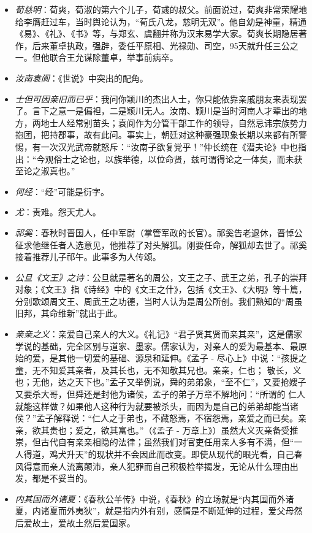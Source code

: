 \documentclass[]{book}
\providecommand{\tightlist}{%
  \setlength{\itemsep}{0pt}\setlength{\parskip}{0pt}}
\begin{document}
\begin{itemize}
\tightlist
\item
  \emph{荀慈明}：荀爽，荀淑的第六个儿子，荀彧的叔父。前面说过，荀爽非常荣耀地给李膺赶过车，当时舆论认为，``荀氏八龙，慈明无双''。他自幼是神童，精通《易》、《礼》、《书》等，与郑玄、虞翻并称为汉末易学大家。荀爽长期隐居著作，后来董卓执政，强辟，委任平原相、光禄勋、司空，95天就升任三公之一。但他联合王允谋除董卓，举事前病卒。
\item
  \emph{汝南袁阆}：《世说》中突出的配角。
\item
  \emph{士但可因亲旧而已乎}：我问你颖川的杰出人士，你只能依靠亲戚朋友来表现罢了。言下之意一是偏袒，二是颖川无人。汝南、颖川是当时河南人才辈出的地方，两地士人经常别苗头；袁阆作为分管干部工作的领导，自然忌讳宗族势力抱团，把持郡事，故有此问。事实上，朝廷对这种豪强现象长期以来都有所警惕，有一次汉光武帝就怒斥：``汝南子欲复党乎！''仲长统在《潜夫论》中也指出：``今观俗士之论也，以族举德，以位命贤，兹可谓得论之一体矣，而未获至论之淑真也。''
\item
  \emph{何经}：``经''可能是衍字。
\item
  \emph{尤}：责难。怨天尤人。
\item
  \emph{祁奚}：春秋时晋国人，任中军尉（掌管军政的长官）。祁奚告老退休，晋悼公征求他继任者人选意见，他推荐了对头解狐。刚要任命，解狐却去世了。祁奚接着推荐儿子祁午。此事多为人传颂。
\item
  \emph{公旦《文王》之诗}：公旦就是著名的周公，文王之子、武王之弟，孔子的崇拜对象；《文王》指《诗经》中的《文王之什》，包括《文王》、《大明》等十篇，分别歌颂周文王、周武王之功德，当时人认为是周公所创。我们熟知的``周虽旧邦，其命维新''就出于此。
\item
  \emph{亲亲之义}：亲爱自己亲人的大义。《礼记》``君子贤其贤而亲其亲''，这是儒家学说的基础，完全区别与道家、墨家。儒家认为，对亲人的爱为最基本、最原始的爱，是其他一切爱的基础、源泉和延伸。《孟子
  -
  尽心上》中说：``孩提之童，无不知爱其亲者，及其长也，无不知敬其兄也。亲亲，仁也；
  敬长，义也；无他，达之天下也。''孟子又举例说，舜的弟弟象，``至不仁''，又要抢嫂子又要杀大哥，但舜还是封他为诸侯，孟子的弟子万章不解地问：``所谓的
  仁人就能这样做？如果他人这种行为就要被杀头，而因为是自己的弟弟却能当诸侯？''孟子解释说：``仁人之于弟也，不藏怒焉，不宿怨焉，亲爱之而已矣。亲亲，欲其贵也；爱之，欲其富也。''（《孟子
  -
  万章上》）虽然大义灭亲备受推崇，但古代自有亲亲相隐的法律；虽然我们对官吏任用亲人多有不满，但``一人得道，鸡犬升天''的现状并不会因此而改变。即使从现代的眼光看，自己春风得意而亲人流离颠沛，亲人犯罪而自己积极检举揭发，无论从什么理由出发，都是不妥当的。
\item
  \emph{内其国而外诸夏}：《春秋公羊传》中说，《春秋》的立场就是``内其国而外诸夏，内诸夏而外夷狄''，就是指内外有别，感情是不断延伸的过程，爱父母然后爱故土，爱故土然后爱国家。
\end{itemize}
\end{document}
